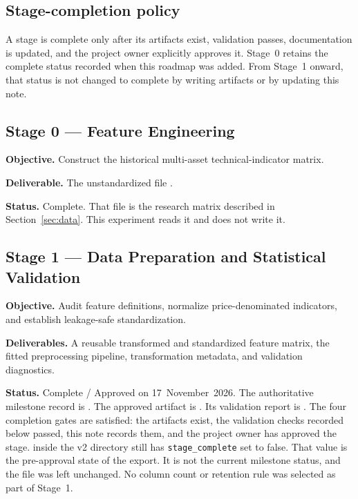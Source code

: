 \documentclass[11pt]{article}
\begin{document}
\subsection{Stage-completion policy}

A stage is complete only after its artifacts exist, validation passes, documentation is updated, and the project owner explicitly approves it.
Stage~0 retains the complete status recorded when this roadmap was added.
From Stage~1 onward, that status is not changed to complete by writing artifacts or by updating this note.

\subsection{Stage 0 --- Feature Engineering}

\textbf{Objective.} Construct the historical multi-asset technical-indicator matrix.

\textbf{Deliverable.} The unstandardized file .

\textbf{Status.} Complete.
That file is the research matrix described in Section~\ref{sec:data}.
This experiment reads it and does not write it.

\subsection{Stage 1 --- Data Preparation and Statistical Validation}

\textbf{Objective.} Audit feature definitions, normalize price-denominated indicators, and establish leakage-safe standardization.

\textbf{Deliverables.} A reusable transformed and standardized feature matrix, the fitted preprocessing pipeline, transformation metadata, and validation diagnostics.

\textbf{Status.} Complete / Approved on 17~November~2026.
The authoritative milestone record is .
The approved artifact is .
Its validation report is .
The four completion gates are satisfied: the artifacts exist, the validation checks recorded below passed, this note records them, and the project owner has approved the stage.
 inside the v2 directory still has \texttt{stage\_complete} set to false.
That value is the pre-approval state of the export.
It is not the current milestone status, and the file was left unchanged.
No column count or retention rule was selected as part of Stage~1.
\end{document}
